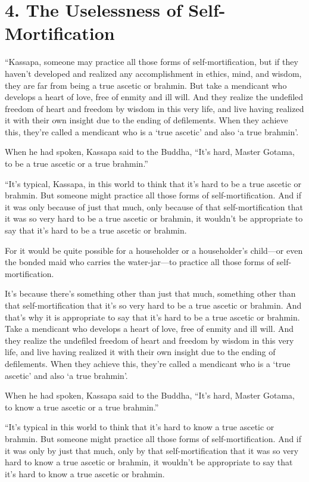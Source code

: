 \documentclass[12pt,openany]{book}%
\begin{document}
\section*{4. The Uselessness of Self-Mortification }

“Kassapa, someone may practice all those forms of self-mortification, but if they haven’t developed and realized any accomplishment in ethics, mind, and wisdom, they are far from being a true ascetic or brahmin. But take a mendicant who develops a heart of love, free of enmity and ill will. And they realize the undefiled freedom of heart and freedom by wisdom in this very life, and live having realized it with their own insight due to the ending of defilements. When they achieve this, they’re called a mendicant who is a ‘true ascetic’ and also ‘a true brahmin’. 

When he had spoken, Kassapa said to the Buddha, “It’s hard, Master Gotama, to be a true ascetic or a true brahmin.” 

“It’s typical, Kassapa, in this world to think that it’s hard to be a true ascetic or brahmin. But someone might practice all those forms of self-mortification. And if it was only because of just that much, only because of that self-mortification that it was so very hard to be a true ascetic or brahmin, it wouldn’t be appropriate to say that it’s hard to be a true ascetic or brahmin. 

For it would be quite possible for a householder or a householder’s child—or even the bonded maid who carries the water-jar—to practice all those forms of self-mortification. 

It’s because there’s something other than just that much, something other than that self-mortification that it’s so very hard to be a true ascetic or brahmin. And that’s why it is appropriate to say that it’s hard to be a true ascetic or brahmin. Take a mendicant who develops a heart of love, free of enmity and ill will. And they realize the undefiled freedom of heart and freedom by wisdom in this very life, and live having realized it with their own insight due to the ending of defilements. When they achieve this, they’re called a mendicant who is a ‘true ascetic’ and also ‘a true brahmin’. 

When he had spoken, Kassapa said to the Buddha, “It’s hard, Master Gotama, to know a true ascetic or a true brahmin.” 

“It’s typical in this world to think that it’s hard to know a true ascetic or brahmin. But someone might practice all those forms of self-mortification. And if it was only by just that much, only by that self-mortification that it was so very hard to know a true ascetic or brahmin, it wouldn’t be appropriate to say that it’s hard to know a true ascetic or brahmin. 
\end{document}
